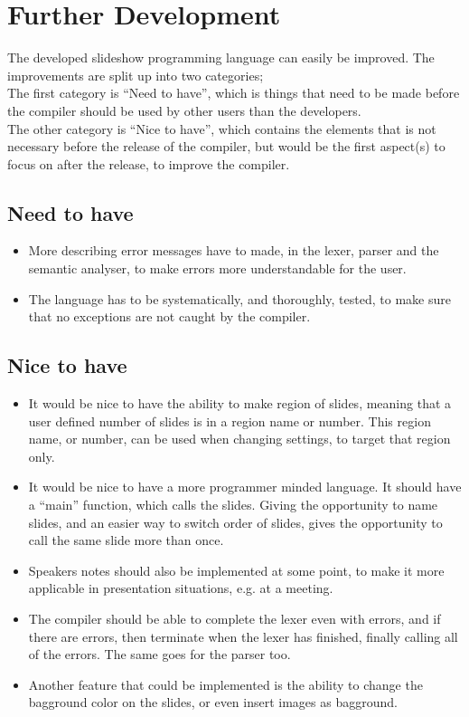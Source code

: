 \chapter{Further Development}
\label{sec:furtherdev}
The developed slideshow programming language can easily be improved. The improvements are split up into two categories; \\
The first category is ``Need to have'', which is things that need to be made before the compiler should be used by other users than the developers. \\
The other category is ``Nice to have'', which contains the elements that is not necessary before the release of the compiler, but would be the first aspect(s) to focus on after the release, to improve the compiler.

\section{Need to have}
\begin{itemize}
	\item More describing error messages have to made, in the lexer, parser and the semantic analyser, to make errors more understandable for the user.
	\item The language has to be systematically, and thoroughly, tested, to make sure that no exceptions are not caught by the compiler.
\end{itemize}

\section{Nice to have}
\begin{itemize}
	\item It would be nice to have the ability to make region of slides, meaning that a user defined number of slides is in a region name or number. This region name, or number, can be used when changing settings, to target that region only.
	\item It would be nice to have a more programmer minded language. It should have a ``main'' function, which calls the slides. Giving the opportunity to name slides, and an easier way to switch order of slides, gives the opportunity to call the same slide more than once.
	\item Speakers notes should also be implemented at some point, to make it more applicable in presentation situations, e.g. at a meeting.
	\item The compiler should be able to complete the lexer even with errors, and if there are errors, then terminate when the lexer has finished, finally calling all of the errors. The same goes for the parser too.
	\item Another feature that could be implemented is the ability to change the bagground color on the slides, or even insert images as bagground.
\end{itemize}